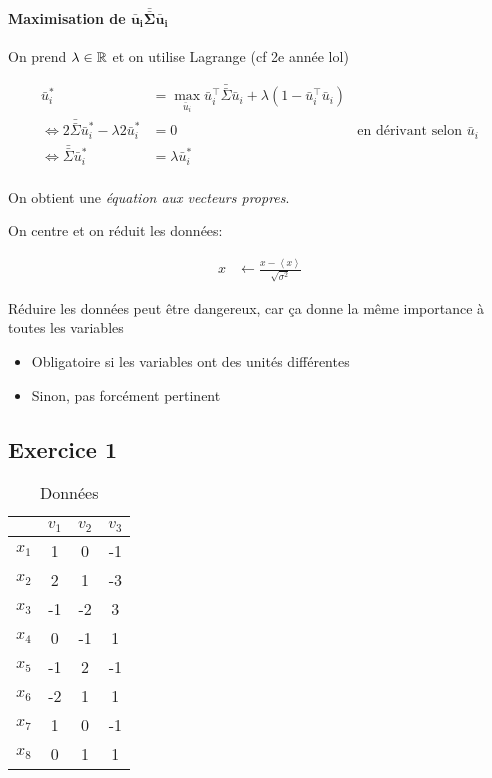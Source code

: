 \documentclass{article}
\renewcommand{\overline}{\bar}
\begin{document}
	\paragraph{Maximisation de $\boldsymbol{\bar{u}_i \bar{\bar{\Sigma}} \bar{u}_i}$}

	On prend $\lambda \in \mathbb{R}$ et on utilise Lagrange (cf 2e année lol)

	\begin{align*}
		\bar{u}_i^\ast &= \max_{\bar{u}_i} \bar{u}_i^\top \bar{\bar{\Sigma}} \bar{u}_i + \lambda (1 - \bar{u}_i^\top \bar{u}_i) \\
		\iff 2 \bar{\bar{\Sigma}} \bar{u}_i^\ast  - \lambda 2 \bar{u}_i^\ast &= 0 \quad&\text{en dérivant selon $\overline{u}_i$} \\
		\iff \bar{\bar{\Sigma}} \bar{u}_i^\ast &= \lambda \bar{u}_i^\ast \\
	\end{align*}


	On obtient une \emph{équation aux vecteurs propres}.

	On centre et on réduit les données:

	\begin{align*}
		x &\leftarrow \frac{x - \left<x \right>}{\sqrt{\sigma^2} }
	\end{align*}

	\begin{warning}
		Réduire les données peut être dangereux, car ça donne la même importance à toutes les variables

		\begin{itemize}
			\item Obligatoire si les variables ont des unités différentes
			\item Sinon, pas forcément pertinent
		\end{itemize}
	\end{warning}

	\subsection{Exercice 1}

	\begin{table}[H]
		\centering
		\caption{Données}
		\label{tab:donnes-exercice-1-individuel}
		\begin{tabular}{c|ccc}
		 & $v_1$ & $v_2$ & $v_3$ \\\hline
			$x_1$ & 1 & 0 & -1 \\
			$x_2$ & 2 & 1 & -3 \\
			$x_3$ & -1 & -2 & 3 \\
			$x_4$ & 0 & -1 & 1 \\
			$x_5$ & -1 & 2 & -1 \\
			$x_6$ & -2 & 1 & 1 \\
			$x_7$ & 1 & 0 & -1 \\
			$x_8$  & 0 & 1 & 1
		\end{tabular}
	\end{table}
	
\end{document}
